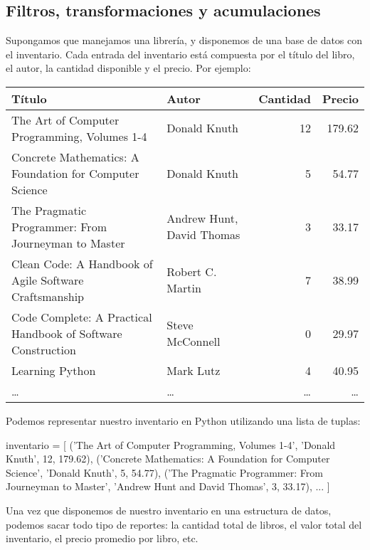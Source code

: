 \newpage
\begin{subappendices}
\section{Filtros, transformaciones y acumulaciones}

Supongamos que manejamos una librería, y disponemos de una base de datos con el
inventario. Cada entrada del inventario está compuesta por el título del libro,
el autor, la cantidad disponible y el precio. Por ejemplo:

\begin{center}
\small
{}
\begin{tabular}{p{8cm} p{3cm} r r}
{\bf Título} & {\bf Autor} & {\bf Cantidad} & {\bf Precio} \\
\hline
The Art of Computer Programming, Volumes 1-4 & Donald Knuth & 12 & 179.62 \\
Concrete Mathematics: A Foundation for Computer Science & Donald Knuth & 5 & 54.77 \\
The Pragmatic Programmer: From Journeyman to Master & Andrew Hunt, David Thomas & 3 & 33.17 \\
Clean Code: A Handbook of Agile Software Craftsmanship & Robert C. Martin & 7 & 38.99 \\
Code Complete: A Practical Handbook of Software Construction & Steve McConnell & 0 & 29.97 \\
Learning Python & Mark Lutz & 4 & 40.95 \\
\ldots & \ldots & \ldots & \ldots \\ \hline
\end{tabular}
\end{center}

Podemos representar nuestro inventario en Python utilizando una lista de
tuplas:

\begin{codigo-python-sn}
inventario = [
    ('The Art of Computer Programming, Volumes 1-4',
     'Donald Knuth', 12, 179.62),
    ('Concrete Mathematics: A Foundation for Computer Science',
     'Donald Knuth', 5, 54.77),
    ('The Pragmatic Programmer: From Journeyman to Master',
     'Andrew Hunt and David Thomas', 3, 33.17),
    ...
]
\end{codigo-python-sn}

Una vez que disponemos de nuestro inventario en una estructura de datos,
podemos sacar todo tipo de
reportes: la cantidad total de libros, el valor total del
inventario, el precio promedio por libro, etc.


\end{subappendices}
